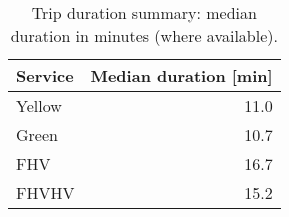 \begin{table}
\caption{Trip duration summary: median duration in minutes (where available).}
\label{tab:t4_duration}
\begin{tabular}{lr}
\toprule
Service & Median duration [min] \\
\midrule
Yellow & 11.0 \\
Green & 10.7 \\
FHV & 16.7 \\
FHVHV & 15.2 \\
\bottomrule
\end{tabular}
\end{table}
